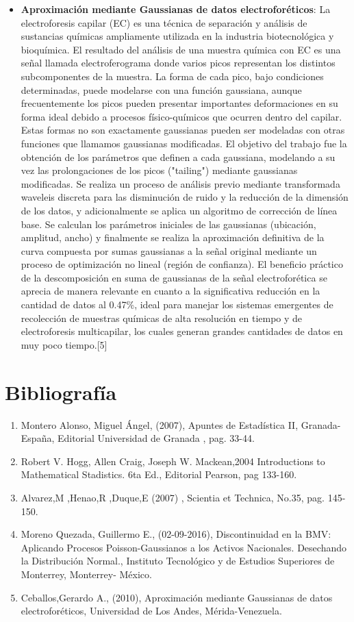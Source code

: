 \documentclass[12pt,a4paper]{article}
\begin{document}
\begin{multicols}{2}
\begin{itemize}
        \item \textbf{Aproximación mediante Gaussianas  de datos electroforéticos}: La electroforesis capilar (EC) es una técnica de separación y análisis de sustancias químicas ampliamente utilizada en la industria biotecnológica y bioquímica. El resultado del análisis de una muestra química con EC es una señal llamada electroferograma donde varios picos  representan los distintos subcomponentes de la muestra. La forma de cada pico, bajo condiciones determinadas, puede modelarse con una función gaussiana, aunque  frecuentemente los picos  pueden presentar importantes deformaciones en su forma ideal debido a procesos físico-químicos que ocurren  dentro del capilar. Estas formas  no son exactamente  gaussianas pueden ser modeladas con otras funciones que llamamos gaussianas modificadas. El objetivo del trabajo  fue la obtención  de los parámetros que definen a cada gaussiana, modelando a su vez  las prolongaciones de los picos ("tailing") mediante gaussianas modificadas. Se realiza un proceso de análisis  previo mediante transformada waveleis discreta para las disminución de ruido y la reducción de la dimensión de los datos, y adicionalmente se aplica un algoritmo de corrección de línea base. Se calculan los parámetros iniciales de las gaussianas (ubicación, amplitud, ancho) y finalmente se realiza la aproximación  definitiva de la  curva compuesta  por sumas gaussianas  a la señal original  mediante un proceso  de optimización no lineal (región de confianza). El beneficio  práctico  de la descomposición en suma de gaussianas  de la señal electroforética se aprecia de manera relevante en cuanto a la  significativa reducción en la cantidad de datos  al 0.47\%, ideal para manejar los sistemas emergentes de recolección  de muestras químicas de alta resolución en tiempo y de electroforesis multicapilar, los cuales generan grandes cantidades de  datos en muy poco tiempo.[5]
    \end{itemize}
\section{Bibliografía}
\begin{enumerate}
    \item Montero Alonso, Miguel Ángel, (2007), Apuntes de Estadística II, Granada-España, Editorial Universidad de Granada , pag. 33-44.
    \item Robert V. Hogg, Allen Craig, Joseph W. Mackean,2004 Introductions to Mathematical Stadistics. 6ta Ed., Editorial Pearson, pag 133-160. 
    \item Alvarez,M ,Henao,R ,Duque,E (2007) , Scientia et Technica, No.35, pag. 145-150.
    \item Moreno Quezada, Guillermo E., (02-09-2016), Discontinuidad en la BMV: Aplicando Procesos Poisson-Gaussianos a los Activos Nacionales. Desechando la Distribución Normal., Instituto Tecnológico y de Estudios Superiores de Monterrey, Monterrey- México.
    \item Ceballos,Gerardo A., (2010), Aproximación mediante Gaussianas de datos electroforéticos, Universidad de Los Andes, Mérida-Venezuela.
\end{enumerate}
\end{multicols}
\end{document}
